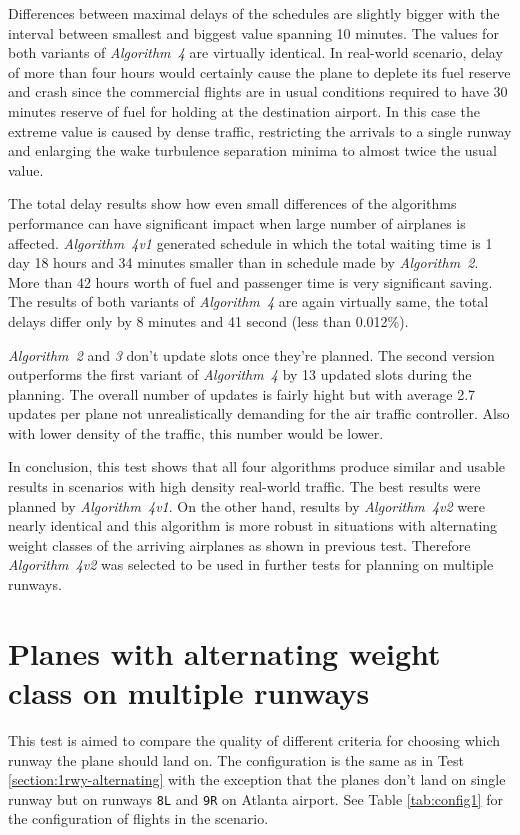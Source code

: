 Differences between maximal delays of the schedules are slightly bigger with the interval between smallest and biggest value spanning 10 minutes. The values for both variants of {\em Algorithm~4} are virtually identical. In real-world scenario, delay of more than four hours would certainly cause the plane to deplete its fuel reserve and crash since the commercial flights are in usual conditions required to have 30 minutes reserve of fuel for holding at the destination airport.\cite[Chapter 4]{annex6} In this case the extreme value is caused by dense traffic, restricting the arrivals to a single runway and enlarging the wake turbulence separation minima to almost twice the usual value.

The total delay results show how even small differences of the algorithms performance can have significant impact when large number of airplanes is affected. {\em Algorithm~4v1} generated schedule in which the total waiting time is 1 day 18 hours and 34 minutes smaller than in schedule made by {\em Algorithm~2}. More than 42 hours worth of fuel and passenger time is very significant saving. The results of both variants of {\em Algorithm~4} are again virtually same, the total delays differ only by 8 minutes and 41 second (less than 0.012\%).

{\em Algorithm~2} and {\em 3} don't update slots once they're planned. The second version outperforms the first variant of {\em Algorithm~4} by 13 updated slots during the planning. The overall number of updates is fairly hight but with average 2.7 updates per plane not unrealistically demanding for the air traffic controller. Also with lower density of the traffic, this number would be lower.

In conclusion, this test shows that all four algorithms produce similar and usable results in scenarios with high density real-world traffic. The best results were planned by {\em Algorithm~4v1}. On the other hand, results by {\em Algorithm~4v2} were nearly identical and this algorithm is more robust in situations with alternating weight classes of the arriving airplanes as shown in previous test. Therefore {\em Algorithm~4v2} was selected to be used in further tests for planning on multiple runways.

\section{Planes with alternating weight class on multiple runways}

This test is aimed to compare the quality of different criteria for choosing which runway the plane should land on. The configuration is the same as in Test \ref{section:1rwy-alternating} with the exception that the planes don't land on single runway but on runways \texttt{8L} and \texttt{9R} on Atlanta airport. See Table \ref{tab:config1} for the configuration of flights in the scenario.


